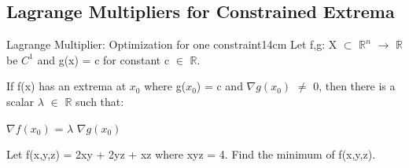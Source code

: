     \newpage





\subsection[ Lagrange Multipliers ]{ Lagrange Multipliers for Constrained Extrema }

    \begin{wtheorem}{Lagrange Multiplier: Optimization for one constraint}{14cm}
        Let f,g: X $\subset$ $\mathbb{R}^n$ $\rightarrow$ $\mathbb{R}$
        be $C^1$ and g(x) = c for constant c $\in$ $\mathbb{R}$.
        
        If f(x) has an extrema at $x_0$ where g($x_0$) = c and
        $\nabla g(x_0)$ $\not =$ 0, then there is a scalar $\lambda$ $\in$
        $\mathbb{R}$ such that:

        \hspace{0.5cm}
        $\nabla f(x_0)$ = $\lambda$ $\nabla g(x_0)$
    \end{wtheorem}

    \vspace{0.5cm}



    \begin{example}
        Let f(x,y,z) = 2xy + 2yz + xz
        where xyz = 4. Find the minimum of f(x,y,z).
    \end{example}


